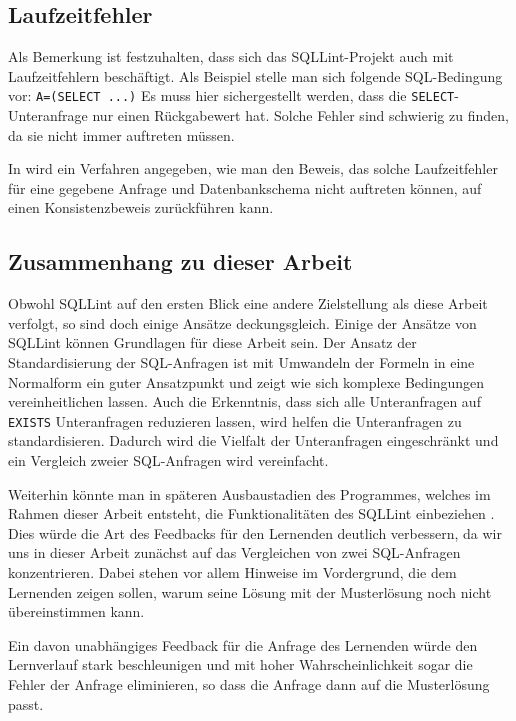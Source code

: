 \subsection{Laufzeitfehler}

Als Bemerkung ist festzuhalten, dass sich das SQLLint-Projekt auch mit Laufzeitfehlern beschäftigt. Als Beispiel stelle man sich folgende SQL-Bedingung vor: \verb|A=(SELECT ...)| Es muss hier sichergestellt werden, dass die \verb|SELECT|-Unteranfrage nur einen Rückgabewert hat. Solche Fehler sind schwierig zu finden, da sie nicht immer auftreten müssen. 

In \cite{brass2} wird ein Verfahren angegeben, wie man den Beweis, das solche Laufzeitfehler für eine gegebene Anfrage und Datenbankschema nicht auftreten können, auf einen Konsistenzbeweis zurückführen kann.

\subsection*{Zusammenhang zu dieser Arbeit}

Obwohl SQLLint auf den ersten Blick eine andere Zielstellung als diese Arbeit verfolgt, so sind doch einige Ansätze deckungsgleich. Einige der Ansätze von SQLLint können Grundlagen für diese Arbeit sein. Der Ansatz der Standardisierung der SQL-Anfragen ist mit Umwandeln der Formeln in eine Normalform ein guter Ansatzpunkt und zeigt wie sich komplexe Bedingungen vereinheitlichen lassen. Auch die Erkenntnis, dass sich alle Unteranfragen auf \verb|EXISTS| Unteranfragen reduzieren lassen, wird helfen die Unteranfragen zu standardisieren. Dadurch wird die Vielfalt der Unteranfragen eingeschränkt und ein Vergleich zweier SQL-Anfragen wird vereinfacht.

Weiterhin könnte man in späteren Ausbaustadien des Programmes, welches im Rahmen dieser Arbeit entsteht, die Funktionalitäten des SQLLint einbeziehen . Dies würde die Art des Feedbacks für den Lernenden deutlich verbessern, da wir uns in dieser Arbeit zunächst auf das Vergleichen von zwei SQL-Anfragen konzentrieren. Dabei stehen vor allem Hinweise im Vordergrund, die dem Lernenden zeigen sollen, warum seine Lösung mit der Musterlösung noch nicht übereinstimmen kann.

Ein davon unabhängiges Feedback für die Anfrage des Lernenden würde den Lernverlauf stark beschleunigen und mit hoher Wahrscheinlichkeit sogar die Fehler der Anfrage eliminieren, so dass die Anfrage dann auf die Musterlösung passt.